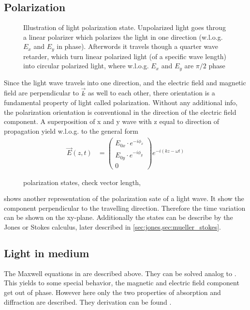 \subsection{Polarization}
% 
\begin{figure}[!t]
\centering
\setlength{\tikzwidth}{\textwidth}
\label{fig:polarization_state}
\caption{Illustration of light polarization state. Unpolarized light goes throug a linear polarizer which polarizes the light in one direction (w.l.o.g. $E_x$ and $E_y$ in phase). Afterwords it travels though a quarter wave retarder, which turn linear polarized light (of a specific wave length) into circular polarized light, where w.l.o.g. $E_x$ and $E_y$ are $\pi/2$ phase}
\end{figure}
% 
Since the light wave travels into one direction, and the electric field and magnetic field are perpendicular to $\vec{k}$ as well to each other, there orientation is a fundamental property of light called polarization.
Without any additional info, the polarization orientation is conventional in the direction of the electric field component.
% 
A superposition of x and y wave with z equal to direction of propagation yield w.l.o.g. to the general form
\begin{align}
\vec{E}(z,t) &= \begin{pmatrix} E_{0x} \cdot e^{ -i \phi_x } \\ E_{0y} \cdot e^{ -i \phi_y } \\ 0 \end{pmatrix}
e^{ -i (kz - \omega t)}
\end{align}
%
\begin{figure}[!t]
\centering
\tikzset{external/export=false}

\caption{polarization states, check vector length,} 
\label{fig:polarization_state_vectors}
\end{figure}
%
 shows another representation of the polarization sate of a light wave.
It show the component perpendicular to the travelling direction.
Therefore the time variation can be shown on the xy-plane.
Additionally the states can be describe by the Jones or Stokes calculus, later described in \cref{sec:jones,sec:mueller_stokes}.
% 
% 
% 
\subsection{Light in medium}
% 
The Maxwell equations in \dummy{} are described above. They can be solved analog to \dummy{}. This yields to some special behavior, \eg{} the magnetic and electric field component get out of phase.
However here only the two properties of absorption and diffraction are described.
They derivation can be found \eg{} \cite{demtroeder2, Fliebach2012}.
% 
